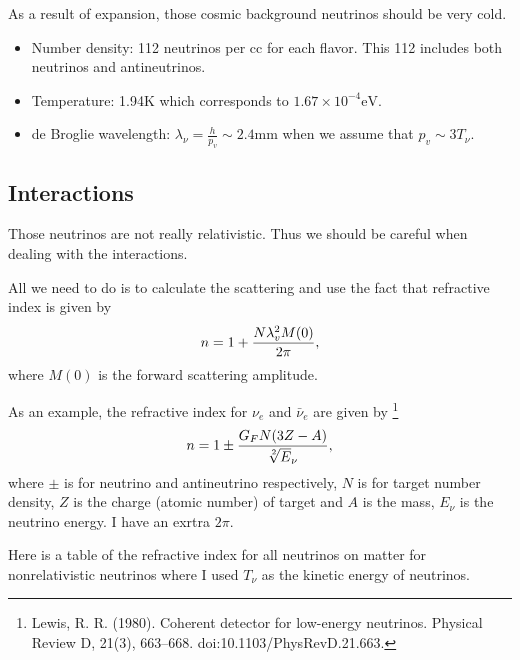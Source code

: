 \documentclass[letterpaper,12pt,english]{sphinxmanual}
\begin{document}
As a result of expansion, those cosmic background neutrinos should be very cold.
\begin{itemize}
\item {} 
Number density: 112 neutrinos per cc for each flavor. This 112 includes both neutrinos and antineutrinos.

\item {} 
Temperature: 1.94K which corresponds to \(1.67\times 10^{-4}\mathrm{eV}\).

\item {} 
de Broglie wavelength: \(\lambda_\nu = \frac{h}{p_v}\sim 2.4 \mathrm{mm}\) when we assume that \(p_v\sim 3T_\nu\).

\end{itemize}


\subsection{Interactions}
\label{cosmology:interactions}
Those neutrinos are not really relativistic. Thus we should be careful when dealing with the interactions.

All we need to do is to calculate the scattering and use the fact that refractive index is given by \footnotemark[1]
\begin{gather}
\begin{split}n = 1 + \frac{N \lambda_v^2 M(0)}{2\pi},\end{split}\notag
\end{gather}
where \(M(0)\) is the forward scattering amplitude.

As an example, the refractive index for \(\nu_e\) and \(\bar\nu_e\) are given by \footnote[5]{
Lewis, R. R. (1980). Coherent detector for low-energy neutrinos. Physical Review D, 21(3), 663–668. doi:10.1103/PhysRevD.21.663.
}
\begin{gather}
\begin{split}n = 1 \pm \frac{G_F N (3Z - A)}{\sqrt[2] E_\nu},\end{split}\notag
\end{gather}
where \(\pm\) is for neutrino and antineutrino respectively, \(N\) is for target number density, \(Z\) is the charge (atomic number) of target and \(A\) is the mass, \(E_\nu\) is the neutrino energy. \footnotemark[5] I have an exrtra \(2\pi\).

Here is a table of the refractive index for all neutrinos on matter for nonrelativistic neutrinos where I used \(T_\nu\) as the kinetic energy of neutrinos.
\end{document}
